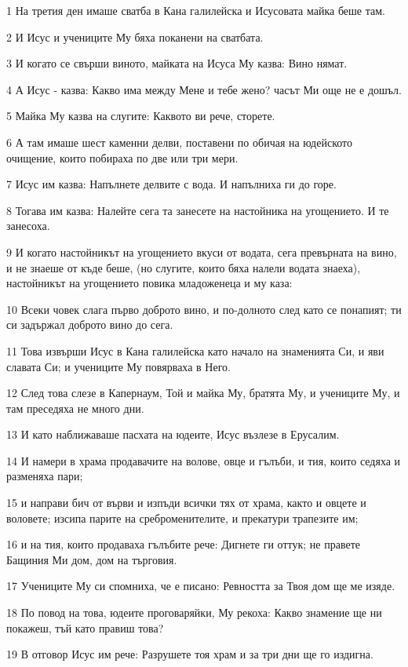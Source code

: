 \par 1 На третия ден имаше сватба в Кана галилейска и Исусовата майка беше там.
\par 2 И Исус и учениците Му бяха поканени на сватбата.
\par 3 И когато се свърши виното, майката на Исуса Му казва: Вино нямат.
\par 4 А Исус - казва: Какво има между Мене и тебе жено? часът Ми още не е дошъл.
\par 5 Майка Му казва на слугите: Каквото ви рече, сторете.
\par 6 А там имаше шест каменни делви, поставени по обичая на юдейското очищение, които побираха по две или три мери.
\par 7 Исус им казва: Напълнете делвите с вода. И напълниха ги до горе.
\par 8 Тогава им казва: Налейте сега та занесете на настойника на угощението. И те занесоха.
\par 9 И когато настойникът на угощението вкуси от водата, сега превърната на вино, и не знаеше от къде беше, (но слугите, които бяха налели водата знаеха), настойникът на угощението повика младоженеца и му каза:
\par 10 Всеки човек слага първо доброто вино, и по-долното след като се понапият; ти си задържал доброто вино до сега.
\par 11 Това извърши Исус в Кана галилейска като начало на знаменията Си, и яви славата Си; и учениците Му повярваха в Него.
\par 12 След това слезе в Капернаум, Той и майка Му, братята Му, и учениците Му, и там преседяха не много дни.
\par 13 И като наближаваше пасхата на юдеите, Исус възлезе в Ерусалим.
\par 14 И намери в храма продавачите на волове, овце и гълъби, и тия, които седяха и разменяха пари;
\par 15 и направи бич от върви и изпъди всички тях от храма, както и овцете и воловете; изсипа парите на среброменителите, и прекатури трапезите им;
\par 16 и на тия, които продаваха гълъбите рече: Дигнете ги оттук; не правете Бащиния Ми дом, дом на търговия.
\par 17 Учениците Му си спомниха, че е писано: Ревността за Твоя дом ще ме изяде.
\par 18 По повод на това, юдеите проговаряйки, Му рекоха: Какво знамение ще ни покажеш, тъй като правиш това?
\par 19 В отговор Исус им рече: Разрушете тоя храм и за три дни ще го издигна.
